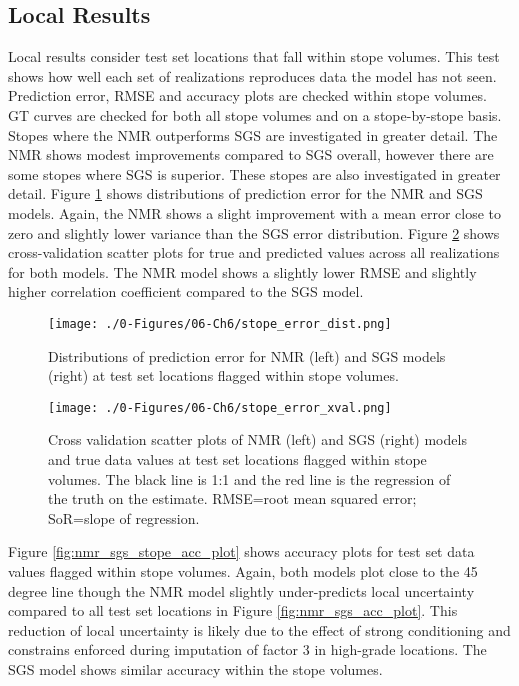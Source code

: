 \FloatBarrier
\subsection{Local Results}
\label{subsec:local}

Local results consider test set locations that fall within stope volumes. This test shows how well each set of realizations reproduces data the model has not seen. Prediction error, \gls{RMSE} and accuracy plots are checked within stope volumes. \Gls{GT} curves are checked for both all stope volumes and on a stope-by-stope basis. Stopes where the \gls{NMR} outperforms \gls{SGS} are investigated in greater detail. The \gls{NMR} shows modest improvements compared to \gls{SGS} overall, however there are some stopes where \gls{SGS} is superior. These stopes are also investigated in greater detail. Figure \ref{fig:stope_error_dist} shows distributions of prediction error for the \gls{NMR} and \gls{SGS} models. Again, the \gls{NMR} shows a slight improvement with a mean error close to zero and slightly lower variance than the \gls{SGS} error distribution. Figure \ref{fig:stope_error_xval} shows cross-validation scatter plots for true and predicted values across all realizations for both models. The \gls{NMR} model shows a slightly lower \gls{RMSE} and slightly higher correlation coefficient compared to the \gls{SGS} model.

\begin{figure}[htb!]
    \centering
    \texttt{[image: ./0-Figures/06-Ch6/stope\_error\_dist.png]}
    \caption{Distributions of prediction error for \gls{NMR} (left) and \gls{SGS} models (right) at test set locations flagged within stope volumes. }
    \label{fig:stope_error_dist}
\end{figure}

\begin{figure}[htb!]
    \centering
    \texttt{[image: ./0-Figures/06-Ch6/stope\_error\_xval.png]}
    \caption{Cross validation scatter plots of  \gls{NMR} (left) and \gls{SGS} (right) models and true data values at test set locations flagged within stope volumes. The black line is 1:1 and the red line is the regression of the truth on the estimate. RMSE=root mean squared error; SoR=slope of regression.}
    \label{fig:stope_error_xval}
\end{figure}

Figure \ref{fig:nmr_sgs_stope_acc_plot} shows accuracy plots for test set data values flagged within stope volumes. Again, both models plot close to the 45 degree line though the \gls{NMR} model slightly under-predicts local uncertainty compared to all test set locations in Figure \ref{fig:nmr_sgs_acc_plot}. This reduction of local uncertainty is likely due to the effect of strong conditioning and constrains enforced during imputation of factor 3 in high-grade locations. The \gls{SGS} model shows similar accuracy within the stope volumes.

